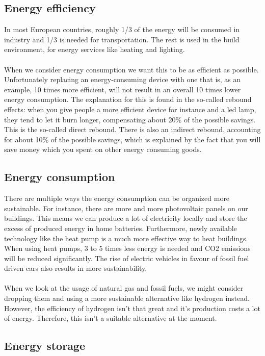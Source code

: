 \documentclass[../summary.tex]{subfiles}
\begin{document}
	\subsection{Energy efficiency}
	
	In most European countries, roughly 1/3 of the energy will be consumed in industry and 1/3 is needed for transportation. The rest is used in the build environment, for energy services like heating and lighting. 
	\\\\
	When we consider energy consumption we want this to be as efficient as possible. Unfortunately replacing an energy-consuming device with one that is, as an example, 10 times more efficient, will not result in an overall 10 times lower energy consumption. The explanation for this is found in the so-called rebound effects: when you give people a more efficient device for instance and a led lamp, they tend to let it burn longer, compensating about 20\% of the possible savings. This is the so-called direct rebound. There is also an indirect rebound, accounting for about 10\% of the possible savings, which is explained by the fact that you will save money which you spent on other energy consuming goods.  
	
	\subsection{Energy consumption}
	
	There are multiple ways the energy consumption can be organized more sustainable. For instance, there are more and more photovoltaic panels on our buildings. This means we can produce a lot of electricity locally and store the excess of produced energy in home batteries. Furthermore, newly available technology like the heat pump is a much more effective way to heat buildings. When using heat pumps, 3 to 5 times less energy is needed and CO2 emissions will be reduced significantly. The rise of electric vehicles in favour of fossil fuel driven cars also results in more sustainability.
	\\\\
	When we look at the usage of natural gas and fossil fuels, we might consider dropping them and using a more sustainable alternative like hydrogen instead. However, the efficiency of hydrogen isn't that great and it's production costs a lot of energy. Therefore, this isn't a suitable alternative at the moment.
	
	\subsection{Energy storage}
	
\end{document}
